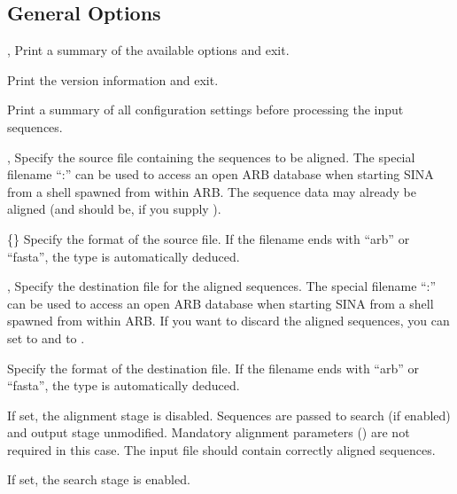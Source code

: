 \documentclass[english,a4paper]{article}
\begin{document}
\subsection{General Options}
\begin{Description}
\item[\Opt{-h}, \Opt{-{}-help}] 
  Print a summary of the available options and exit.
\item[\Opt{-{}-version}] 
  Print the version information and exit.
\item[\Opt{-{}-show-conf}] 
  Print a summary of all configuration settings before processing the input sequences.
\item[\OptArg{-i }{filename}, \OptArg{-{}-in=}{filename}] 
  Specify the source file containing the sequences to be aligned. The special filename ``:'' can be used to 
  access an open ARB database when starting SINA from a shell spawned from within ARB. The sequence data
  may already be aligned (and should be, if you supply ).
\item[\Opt{-{}-intype} \{\Arg{fasta}\Bar\Arg{arb}\}]
  Specify the format of the source file. If the filename ends with ``arb'' or ``fasta'', the type 
  is automatically deduced. 
\item[\OptArg{-o }{filename}, \OptArg{-{}-out=}{filename}]
  Specify the destination file for the aligned sequences. The special filename ``:'' can be used to access 
  an open ARB database when starting SINA from a shell spawned from within ARB. If you want to discard 
  the aligned sequences, you can set  to  and  to .
\item[\OptArg{-{}-outtype }{fasta\Bar arb}]
  Specify the format of the destination file. If the filename ends with ``arb'' or ``fasta'', the type 
  is automatically deduced. 
\item[\Opt{-{}-prealigned}]
  If set, the alignment stage is disabled. Sequences are passed to search (if enabled) and output
  stage unmodified. Mandatory alignment parameters () are not required in this case.
  The input file should contain correctly aligned sequences. 
\item[\Opt{-{}-search}]
  If set, the search stage is enabled. 
\end{Description}
\end{document}
